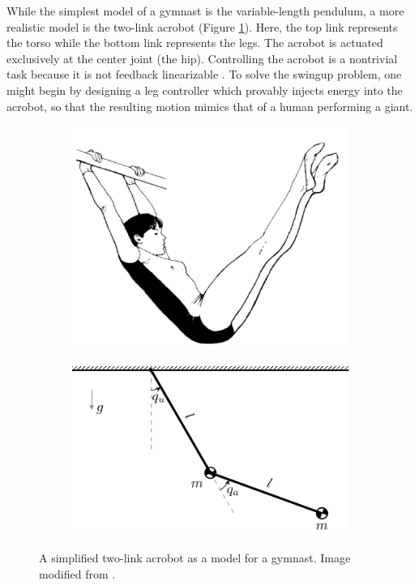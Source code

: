 \documentclass[journal,twoside,web, twocolumn,draftcls]{ieeecolor}
\begin{document}
While the simplest model of a gymnast is the variable-length pendulum, a
more realistic model is the two-link acrobot (Figure \ref{fig:acrobot}).
Here, the top link represents the torso while the bottom link represents
the legs. 
The acrobot is actuated exclusively at the center joint (the hip).
Controlling the acrobot is a nontrivial task because it is not feedback
linearizable \cite{nonlinear_controllers_nonintegrable_acrobot}. 
To solve the swingup problem, one might begin by designing a leg controller
which provably injects energy into the acrobot, so that the resulting motion
mimics that of a human performing a giant.

\begin{figure}
    \centering
    \begin{subfigure}[t]{0.40\linewidth}
        \includegraphics[width=\linewidth]{acrobot_gymnast.png}
    \end{subfigure}
    \hfill
    \begin{subfigure}[t]{0.48\linewidth}
        \includegraphics[width=\linewidth]{simple_acrobot_model.pdf}
    \end{subfigure}
    \caption{A simplified two-link acrobot as a model for a gymnast.
    Image modified from \cite{xingbo_thesis}.}
    \label{fig:acrobot}
\end{figure}
\end{document}
